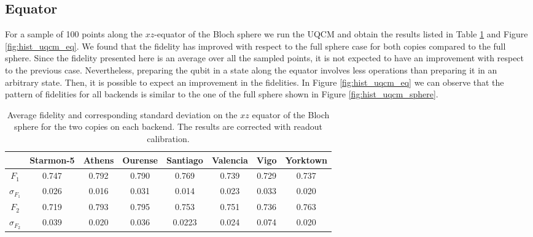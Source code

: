 \subsection{Equator}

For a sample of 100 points along the $xz$-equator of the Bloch sphere we run the UQCM and obtain the results listed in Table \ref{tab:uqcm_results_eq} and Figure \ref{fig:hist_uqcm_eq}. We found that the fidelity has improved with respect to the full sphere case for both copies compared to the full sphere. Since the fidelity presented here is an average over all the sampled points, it is not expected to have an improvement with respect to the previous case. Nevertheless, preparing the qubit in a state along the equator involves less operations than preparing it in an arbitrary state. Then, it is possible to expect an improvement in the fidelities. In Figure \ref{fig:hist_uqcm_eq} we can observe that the pattern of fidelities for all backends is similar to the one of the full sphere shown in Figure \ref{fig:hist_uqcm_sphere}.

\begin{table}[H]
    \centering
    \begin{tabular}{|c|c|c|c|c|c|c|c|}
    \hline
    \textbf{} & \textbf{Starmon-5} & \textbf{Athens} & \textbf{Ourense} & \textbf{Santiago} & \textbf{Valencia} & \textbf{Vigo} & \textbf{Yorktown} \\ \hline
    $F_1$              & 0.747 & 0.792 & 0.790 & 0.769 & 0.739 & 0.729 & 0.737\\ \hline
    $\sigma_{F_1}$     & 0.026 & 0.016 & 0.031 &0.014  & 0.023 & 0.033 & 0.020 \\ \hline
    $F_2$              & 0.719 & 0.793 & 0.795 & 0.753 & 0.751 & 0.736 & 0.763 \\ \hline
    $\sigma_{F_2}$     & 0.039 & 0.020 & 0.036 & 0.0223 & 0.024 & 0.074 & 0.020 \\ \hline
    \end{tabular}
    \caption{Average fidelity and corresponding standard deviation on the $xz$ equator of the Bloch sphere for the two copies on each backend. The results are corrected with readout calibration.}\label{tab:uqcm_results_eq}
\end{table}

